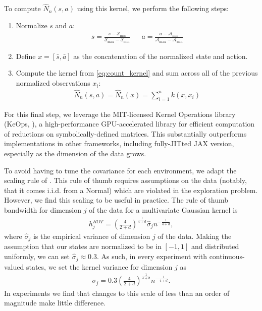 \begin{subappendices}
To compute $\hat N_n(s, a)$ using this kernel, we perform the following steps:
\begin{enumerate}
    \item Normalize $s$ and $a$:
    \begin{align}
        \bar{s} = \frac{s - \mathcal{S}_\text{min}}{\mathcal{S}_\text{max} - \mathcal{S}_\text{min}} && \bar{a} = \frac{a - \mathcal{A}_\text{min}}{\mathcal{A}_\text{max} - \mathcal{A}_\text{min}}
    \end{align}
    \item Define $x = [\bar{s}, \bar{a}]$ as the concatenation of the normalized state and action.
    \item Compute the kernel from \cref{eq:count_kernel} and sum across all of the previous normalized observations $x_i$:
    \begin{align}
        \hat N_n(s, a) = \hat N_n(x) = \sum_{i=1}^n k(x, x_i)
    \end{align}
\end{enumerate}

For this final step, we leverage the MIT-licensed Kernel Operations library (KeOps, \citet{keops}), a high-performance GPU-accelerated library for efficient computation of reductions on symbolically-defined matrices.
This substantially outperforms implementations in other frameworks, including fully-JITted JAX \citep{jax2018github} version, especially as the dimension of the data grows.

To avoid having to tune the covariance for each environment, we adapt the scaling rule of \citep{Henderson2012NormalRB}.
This rule of thumb requires assumptions on the data (notably, that it comes i.i.d. from a Normal) which are violated in the exploration problem.
However, we find this scaling to be useful in practice.
The rule of thumb bandwidth for dimension $j$ of the data for a multivariate Gaussian kernel is
\begin{align}
    h_j^{ROT} = \left( \frac{4}{2+d}  \right) ^ \frac{1}{4+d} \hat{\sigma}_j n ^ {- \frac{1}{4+d}},
\end{align}
where $\hat{\sigma}_j$ is the empirical variance of dimension $j$ of the data.
Making the assumption that our states are normalized to be in $[-1, 1]$ and distributed uniformly, we can set $\hat{\sigma}_j \approx 0.3$.
As such, in every experiment with continuous-valued states, we set the kernel variance for dimension $j$ as
\begin{align}
    \sigma_j = 0.3 \left( \frac{4}{2+d} \right) ^ \frac{1}{4+d} n ^ {- \frac{1}{4+d}} .
\end{align}
In experiments we find that changes to this scale of less than an order of magnitude make little difference.


\end{subappendices}
